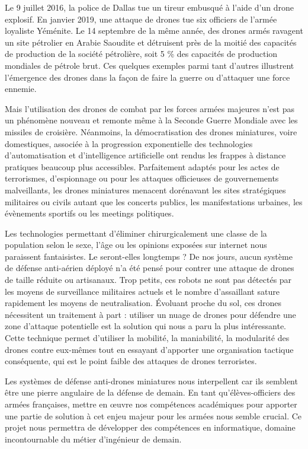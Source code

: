 \documentclass[12pt, openany]{article}
\begin{document}
Le 9 juillet 2016, la police de Dallas tue un tireur embusqué à l’aide d’un drone explosif. En janvier 2019, une attaque de drones tue six officiers de l’armée loyaliste Yéménite. Le 14 septembre de la même année, des drones armés ravagent un site pétrolier en Arabie Saoudite et détruisent près de la moitié des capacités de production de la société pétrolière, soit 5 \% des capacités de production mondiales de pétrole brut. Ces quelques exemples parmi tant d’autres illustrent l’émergence des drones dans la façon de faire la guerre ou d’attaquer une force ennemie.

Mais l’utilisation des drones de combat par les forces armées majeures n’est pas un phénomène nouveau et remonte même à la Seconde Guerre Mondiale avec les missiles de croisière. Néanmoins, la démocratisation des drones miniatures, voire domestiques, associée à la progression exponentielle des technologies d’automatisation et d’intelligence artificielle ont rendus les frappes à distance pratiques beaucoup plus accessibles. Parfaitement adaptés pour les actes de terrorismes, d’espionnage ou pour les attaques officieuses de gouvernements malveillants, les drones miniatures menacent dorénavant les sites stratégiques militaires ou civils autant que les concerts publics, les manifestations urbaines, les évènements sportifs ou les meetings politiques. 

Les technologies permettant d’éliminer chirurgicalement une classe de la population selon le sexe, l’âge ou les opinions exposées sur internet nous paraissent fantaisistes. Le seront-elles longtemps ? De nos jours, aucun système de défense anti-aérien déployé n’a été pensé pour contrer une attaque de drones de taille réduite ou artisanaux. Trop petits, ces robots ne sont pas détectés par les moyens de surveillance militaires actuels et le nombre d’assaillant sature rapidement les moyens de neutralisation. Évoluant proche du sol, ces drones nécessitent un traitement à part : utiliser un nuage de drones pour défendre une zone d’attaque potentielle est la solution qui nous a paru la plus intéressante. Cette technique permet d’utiliser la mobilité, la maniabilité, la modularité des drones contre eux-mêmes tout en essayant d’apporter une organisation tactique conséquente, qui est le point faible des attaques de drones terroristes.

Les systèmes de défense anti-drones miniatures nous interpellent car ils semblent être une pierre angulaire de la défense de demain. En tant qu’élèves-officiers des armées françaises, mettre en œuvre nos compétences académiques pour apporter une partie de solution à cet enjeu majeur pour les armées nous semble crucial. Ce projet nous permettra de développer des compétences en informatique, domaine incontournable du métier d’ingénieur de demain. 
\end{document}

